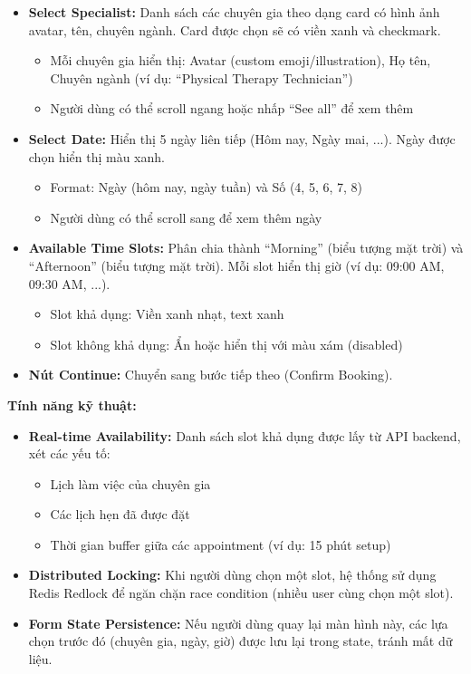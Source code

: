 \begin{itemize}
    \item \textbf{Select Specialist:} Danh sách các chuyên gia theo dạng card có hình ảnh avatar, tên, chuyên ngành. Card được chọn sẽ có viền xanh và checkmark.
    \begin{itemize}
        \item Mỗi chuyên gia hiển thị: Avatar (custom emoji/illustration), Họ tên, Chuyên ngành (ví dụ: ``Physical Therapy Technician'')
        \item Người dùng có thể scroll ngang hoặc nhấp ``See all'' để xem thêm
    \end{itemize}
    
    \item \textbf{Select Date:} Hiển thị 5 ngày liên tiếp (Hôm nay, Ngày mai, ...). Ngày được chọn hiển thị màu xanh.
    \begin{itemize}
        \item Format: Ngày (hôm nay, ngày tuần) và Số (4, 5, 6, 7, 8)
        \item Người dùng có thể scroll sang để xem thêm ngày
    \end{itemize}
    
    \item \textbf{Available Time Slots:} Phân chia thành ``Morning'' (biểu tượng mặt trời) và ``Afternoon'' (biểu tượng mặt trời). Mỗi slot hiển thị giờ (ví dụ: 09:00 AM, 09:30 AM, ...).
    \begin{itemize}
        \item Slot khả dụng: Viền xanh nhạt, text xanh
        \item Slot không khả dụng: Ẩn hoặc hiển thị với màu xám (disabled)
    \end{itemize}
    
    \item \textbf{Nút Continue:} Chuyển sang bước tiếp theo (Confirm Booking).
\end{itemize}

\textbf{Tính năng kỹ thuật:}

\begin{itemize}
    \item \textbf{Real-time Availability:} Danh sách slot khả dụng được lấy từ API backend, xét các yếu tố:
    \begin{itemize}
        \item Lịch làm việc của chuyên gia
        \item Các lịch hẹn đã được đặt
        \item Thời gian buffer giữa các appointment (ví dụ: 15 phút setup)
    \end{itemize}
    
    \item \textbf{Distributed Locking:} Khi người dùng chọn một slot, hệ thống sử dụng Redis Redlock để ngăn chặn race condition (nhiều user cùng chọn một slot).
    
    \item \textbf{Form State Persistence:} Nếu người dùng quay lại màn hình này, các lựa chọn trước đó (chuyên gia, ngày, giờ) được lưu lại trong state, tránh mất dữ liệu.
\end{itemize}

